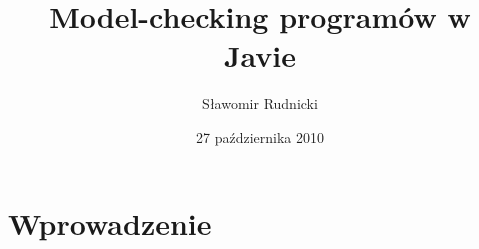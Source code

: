 \documentclass[handout]{beamer}
\title{Model-checking programów w Javie}
\author{Sławomir Rudnicki}
\institute{Niezawodność systemów współbieżnych i obiektowych}
\date{27 października 2010}
\begin{document}
\begin{frame}
  \titlepage
\end{frame}
\begin{frame}
  \tableofcontents
\end{frame}

\section{Wprowadzenie}
\end{document}
